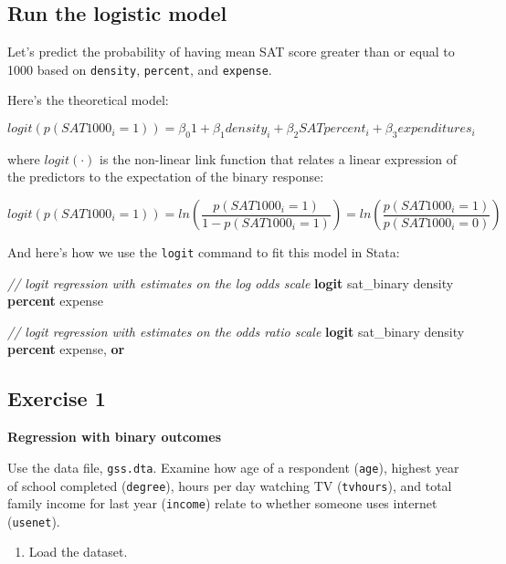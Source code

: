 \documentclass[
]{book}
\newenvironment{Shaded}{\begin{snugshade}}{\end{snugshade}}
\newcommand{\CommentTok}[1]{\textcolor[rgb]{0.56,0.35,0.01}{\textit{#1}}}
\newcommand{\KeywordTok}[1]{\textcolor[rgb]{0.13,0.29,0.53}{\textbf{#1}}}
\newcommand{\NormalTok}[1]{#1}
\providecommand{\tightlist}{%
  \setlength{\itemsep}{0pt}\setlength{\parskip}{0pt}}
\begin{document}
\hypertarget{run-the-logistic-model}{%
\subsection{Run the logistic model}\label{run-the-logistic-model}}

Let's predict the probability of having mean SAT score greater than or equal to 1000 based on \texttt{density}, \texttt{percent}, and \texttt{expense}.

Here's the theoretical model:

\[
logit(p(SAT1000_i = 1)) = \beta_{0}1 + \beta_1density_i + \beta_2SATpercent_i + \beta_3expenditures_i 
\]

where \(logit(\cdot)\) is the non-linear link function that relates a linear expression of the predictors to the expectation of the binary response:

\[
logit(p(SAT1000_i = 1)) = ln \left( \frac{p(SAT1000_i = 1)}{1-p(SAT1000_i = 1)} \right) = ln \left( \frac{p(SAT1000_i = 1)}{p(SAT1000_i = 0)} \right)
\]

And here's how we use the \texttt{logit} command to fit this model in Stata:

\begin{Shaded}
\begin{Highlighting}[]
\CommentTok{// logit regression with estimates on the log odds scale }
\KeywordTok{logit}\NormalTok{ sat\_binary density }\KeywordTok{percent}\NormalTok{ expense}

\CommentTok{// logit regression with estimates on the odds ratio scale }
\KeywordTok{logit}\NormalTok{ sat\_binary density }\KeywordTok{percent}\NormalTok{ expense, }\KeywordTok{or} 
\end{Highlighting}
\end{Shaded}

\hypertarget{exercise-1-8}{%
\subsection{Exercise 1}\label{exercise-1-8}}

\textbf{Regression with binary outcomes}

Use the data file, \texttt{gss.dta}. Examine how age of a respondent (\texttt{age}), highest year of school completed (\texttt{degree}), hours per day watching TV (\texttt{tvhours}), and total family income for last year (\texttt{income}) relate to whether someone uses internet (\texttt{usenet}).

\begin{enumerate}
\def\labelenumi{\arabic{enumi}.}
\tightlist
\item
  Load the dataset.
\end{enumerate}
\end{document}
